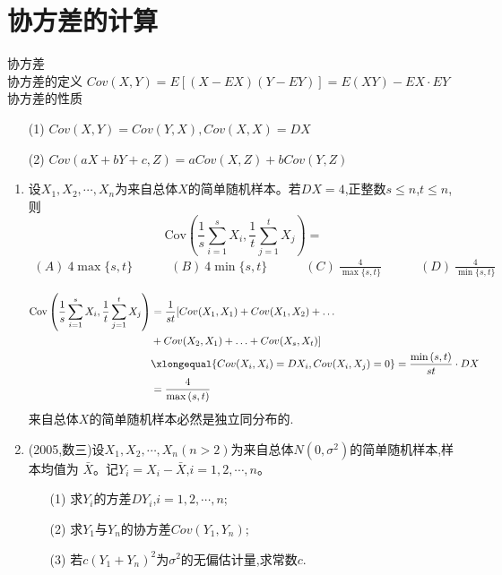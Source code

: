 \documentclass[12pt, a4paper, oneside, UTF8]{ctexbook}
\begin{document}
\section{协方差的计算}
\begin{remark}
    协方差 \\
    协方差的定义 $Cov(X,Y)=E\left[(X-EX)(Y-EY)\right]=E(XY)-EX\cdot EY$ \\
    协方差的性质
    \begin{enumerate}
    \item[(1)] $Cov(X,Y)=Cov(Y,X),Cov(X,X)=DX$
    \item[(2)] $Cov(aX+bY+c,Z)=aCov(X,Z)+bCov(Y,Z)$ 
    \end{enumerate}
\end{remark}
\begin{enumerate}[label=\arabic*.,start=11]
    \item  设$X_1,X_2,\cdots,X_n$为来自总体$X$的简单随机样本。若$DX=4$,正整数$s\leq n$,$t\leq n$,则
    $$
    \text{Cov}\left(\frac{1}{s}\sum_{i=1}^s X_i,\frac{1}{t}\sum_{j=1}^t X_j\right)=
    $$
    \begin{align*}
        (A)\ 4\max\{s,t\} \qquad\quad (B)\ 4\min\{s,t\} \quad\qquad (C)\ \frac{4}{\max\{s,t\}} \quad\qquad (D)\ \frac{4}{\min\{s,t\}}
    \end{align*}

    \begin{solution}
    \begin{align*}
        \text{Cov}\left(\frac{1}{s}\sum_{i=1}^s X_i,\frac{1}{t}\sum_{j=1}^t X_j\right) 
        &= \frac{1}{st}[Cov(X_1,X_1)+Cov(X_1,X_2)+\ldots \\
        &+Cov(X_2,X_1)+\ldots+Cov(X_s,X_t)] \\
        &\xlongequal{Cov(X_i,X_i)=DX_i,Cov(X_i,X_j)=0}=\frac{\min{(s,t)}}{st}\cdot DX \\
        &=\frac{4}{\max{(s,t)}}
    \end{align*}
    来自总体$X$的简单随机样本必然是独立同分布的.
    \end{solution}
    
    \item  (2005,数三)设$X_1,X_2,\cdots,X_n(n>2)$为来自总体$N(0,\sigma^2)$的简单随机样本,样本均值为
    $\bar{X}$。记$Y_i=X_i-\bar{X}$,$i=1,2,\cdots,n$。
    \begin{enumerate}
        \item[(1)] 求$Y_i$的方差$DY_i$,$i=1,2,\cdots,n$;
        \item[(2)] 求$Y_1$与$Y_n$的协方差$Cov(Y_1,Y_n)$; 
        \item[(3)] 若$c(Y_1+Y_n)^2$为$\sigma^2$的无偏估计量,求常数$c$.
    \end{enumerate}
    

\end{enumerate}
\end{document}
